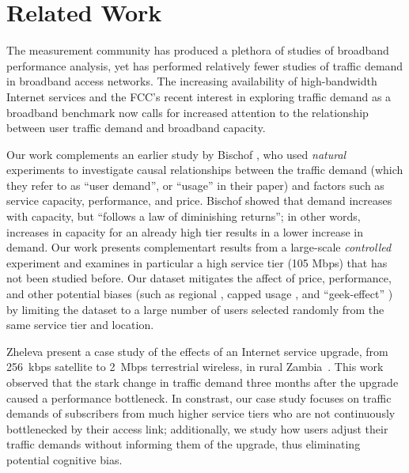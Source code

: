 \section{Related Work}\label{sec:related}

The measurement community has produced a plethora of studies of
broadband performance analysis, yet has performed relatively fewer
studies of traffic demand in broadband access networks.
The increasing availability of high-bandwidth Internet services and the
FCC's recent interest in exploring traffic  
demand as a broadband benchmark \cite{fcc2015progress-report} now calls
for increased attention to the relationship between user traffic demand
and broadband capacity.

Our work complements an earlier study by Bischof \ea \cite{dasu-imc2014},
who used {\em natural} experiments to investigate causal relationships between  
the traffic demand (which they refer to as ``user demand'', or ``usage''
in their paper) 
and factors such as service capacity, performance, and price. Bischof \ea showed 
that demand increases with capacity, but ``follows a law of diminishing  
returns''; in other words, increases in capacity for an already high
tier results in a lower 
increase in demand.
Our work presents complementart results from a large-scale {\em
  controlled} experiment and examines in particular a high service tier
(105 Mbps) that has not been studied before. Our dataset mitigates the
affect of price, performance, and other potential biases (such as
regional \cite{dasu-weather, dasu-region}, capped usage
\cite{youre-capped}, and ``geek-effect'' \cite{dasu-imc2014}) by
limiting the dataset to a large number of users selected randomly from
the same service tier and location.

Zheleva \ea present a case study of the effects of an Internet service
upgrade, from 256~kbps satellite to 2~Mbps terrestrial wireless, in
rural Zambia~\cite{zheleva2013}.  This work observed that the stark change in traffic
demand three months after the upgrade caused a performance
bottleneck. In constrast, our case study focuses on traffic demands of
subscribers from much higher service tiers who are not continuously
bottlenecked by their access link; additionally, we study how users
adjust their traffic demands without informing them of the upgrade, thus
eliminating potential cognitive bias.


